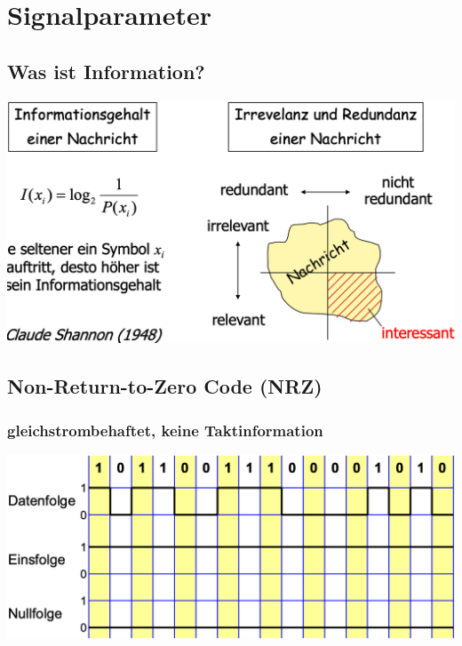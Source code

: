 
\section{Signalparameter}


\subsection{Was ist Information?}
\begin{center}
    \includegraphics[width=\linewidth]{graphic/signalparameter/wasist.png}
\end{center}
\vspace{-8pt}


\subsection{Non-Return-to-Zero Code (NRZ)}
\subsubsection{gleichstrombehaftet, keine Taktinformation}
\begin{center}
    \includegraphics[width=\linewidth]{graphic/signalparameter/gleichstrombehaftet.png}
\end{center}
\vspace{-8pt}

